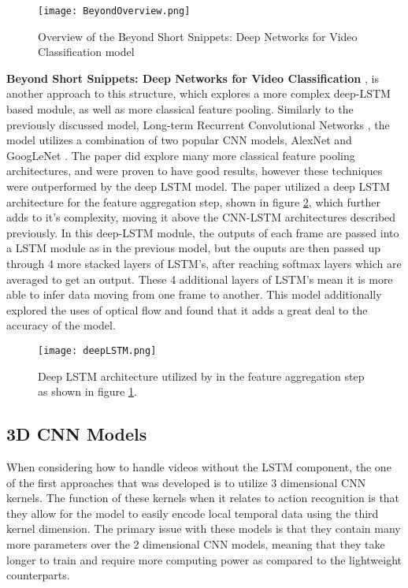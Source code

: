 \begin{figure}[ht]
	\texttt{[image: BeyondOverview.png]}
	\centering
	\caption{Overview of the Beyond Short Snippets: Deep Networks for Video Classification model \cite{beyondshortsnippets}}
	\label{fig:beyondoverview}
\end{figure}

\textbf{Beyond Short Snippets: Deep Networks for Video Classification} \cite{beyondshortsnippets}, is another approach to this structure, which explores a more complex deep-LSTM based module, as well as more classical feature pooling. Similarly to the previously discussed model, Long-term Recurrent Convolutional Networks \cite{LRCNS}, the model utilizes a combination of two popular CNN models, AlexNet \cite{alexnet} and GoogLeNet \cite{googlenet}. The paper did explore many more classical feature pooling architectures, and were proven to have good results, however these techniques were outperformed by the deep LSTM model. The paper utilized a deep LSTM architecture for the feature aggregation step, shown in figure \ref{fig:deeplstm}, which further adds to it's complexity, moving it above the CNN-LSTM architectures described previously. In this deep-LSTM module, the outputs of each frame are passed into a LSTM module as in the previous model, but the ouputs are then passed up through 4 more stacked layers of LSTM's, after reaching softmax layers which are averaged to get an output. These 4 additional layers of LSTM's mean it is more able to infer data moving from one frame to another. This model additionally explored the uses of optical flow and found that it adds a great deal to the accuracy of the model.

\begin{figure}[ht]
	\texttt{[image: deepLSTM.png]}
	\centering
	\caption{Deep LSTM architecture utilized by \cite{beyondshortsnippets} in the feature aggregation step as shown in figure \ref{fig:beyondoverview}.}
	\label{fig:deeplstm}
\end{figure}

\subsection{3D CNN Models}
\label{sec:3dCNNModels}

When considering how to handle videos without the LSTM component, the one of the first approaches that was developed is to utilize 3 dimensional CNN kernels. The function of these kernels when it relates to action recognition is that they allow for the model to easily encode local temporal data using the third kernel dimension. The primary issue with these models is that they contain many more parameters over the 2 dimensional CNN models, meaning that they take longer to train and require more computing power as compared to the lightweight counterparts.

